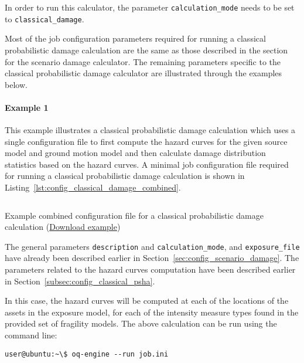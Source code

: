 In order to run this calculator, the parameter \Verb+calculation_mode+ needs
to be set to \Verb+classical_damage+.

Most of the job configuration parameters required for running a classical
probabilistic damage calculation are the same as those described in the
section for the scenario damage calculator. The remaining parameters specific
to the classical probabilistic damage calculator are illustrated through the
examples below.

\paragraph{Example 1}

This example illustrates a classical probabilistic damage calculation which
uses a single configuration file to first compute the hazard curves for the
given source model and ground motion model and then calculate damage
distribution statistics based on the hazard curves. A minimal job
configuration file required for running a classical probabilistic damage
calculation is shown in Listing~\ref{lst:config_classical_damage_combined}.

\begin{listing}[htbp]
  \inputminted[firstline=1,firstnumber=1,fontsize=\footnotesize,frame=single,linenos,bgcolor=lightgray,label=job.ini]{ini}{oqum/risk/verbatim/config_classical_damage_combined.ini}
  \caption{Example combined configuration file for a classical probabilistic damage calculation (\href{https://raw.githubusercontent.com/GEMScienceTools/oq-engine-docs/master/oqum/risk/verbatim/config_classical_damage_combined.xml}{Download example})}
  \label{lst:config_classical_damage_combined}
\end{listing}

The general parameters \Verb+description+ and \Verb+calculation_mode+, and
\Verb+exposure_file+ have already been described earlier in
Section~\ref{sec:config_scenario_damage}. The parameters related to the
hazard curves computation have been described earlier in
Section~\ref{subsec:config_classical_psha}.

In this case, the hazard curves will be computed at each of the locations of
the assets in the exposure model, for each of the intensity measure types
found in the provided set of fragility models. The above calculation can be
run using the command line:

\begin{verbatim}
user@ubuntu:~\$ oq-engine --run job.ini
\end{verbatim}

